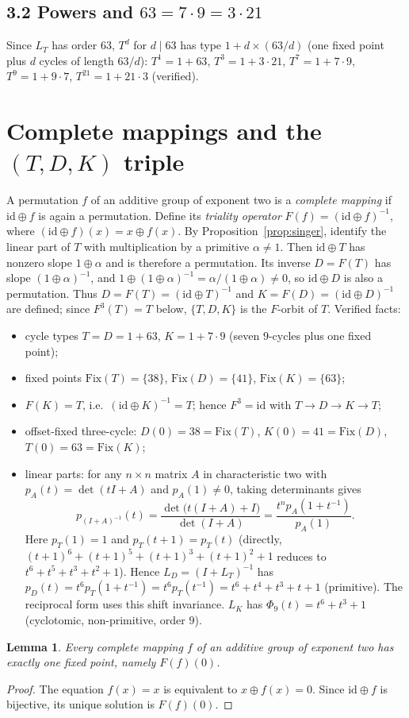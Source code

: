 \documentclass[11pt]{article}
\newtheorem{lemma}[theorem]{Lemma}
\begin{document}
\subsection*{3.2 Powers and $63=7\cdot 9=3\cdot 21$}
Since $L_T$ has order $63$, $T^d$ for $d\mid 63$ has type $1+d\times(63/d)$ (one fixed point plus $d$ cycles of length $63/d$):
$T^1=1+63$, $T^3=1+3\cdot21$, $T^7=1+7\cdot9$, $T^9=1+9\cdot7$,
$T^{21}=1+21\cdot3$ (verified).

\section[Complete mappings and the (T,D,K) triple]{Complete mappings and the $(T,D,K)$ triple}\label{sec:tdk}
A permutation $f$ of an additive group of exponent two is a \emph{complete
mapping} if $\mathrm{id}\oplus f$ is again a permutation. Define its
\emph{triality operator} $F(f)=(\mathrm{id}\oplus f)^{-1}$, where
$(\mathrm{id}\oplus f)(x)=x\oplus f(x)$. By Proposition~\ref{prop:singer},
identify the linear part of $T$ with multiplication by a primitive
$\alpha\ne1$. Then $\mathrm{id}\oplus T$ has nonzero slope
$1\oplus\alpha$ and is therefore a permutation. Its inverse $D=F(T)$ has slope
$(1\oplus\alpha)^{-1}$, and
$1\oplus(1\oplus\alpha)^{-1}=\alpha/(1\oplus\alpha)\ne0$, so
$\mathrm{id}\oplus D$ is also a permutation. Thus
$D=F(T)=(\mathrm{id}\oplus T)^{-1}$ and $K=F(D)=(\mathrm{id}\oplus D)^{-1}$ are
defined; since $F^3(T)=T$ below, $\{T,D,K\}$ is the $F$-orbit of $T$.
Verified facts:
\begin{itemize}
\item cycle types $T=D=1+63$, $K=1+7\cdot 9$ (seven $9$-cycles plus one fixed point);
\item fixed points $\mathrm{Fix}(T)=\{38\}$, $\mathrm{Fix}(D)=\{41\}$,
$\mathrm{Fix}(K)=\{63\}$;
\item $F(K)=T$, i.e.\ $(\mathrm{id}\oplus K)^{-1}=T$; hence $F^3=\mathrm{id}$ with
$T\to D\to K\to T$;
\item offset-fixed three-cycle: $D(0)=38=\mathrm{Fix}(T)$,
$K(0)=41=\mathrm{Fix}(D)$, $T(0)=63=\mathrm{Fix}(K)$;
\item linear parts: for any $n\times n$ matrix $A$ in characteristic two with
$p_A(t)=\det(tI+A)$ and $p_A(1)\ne0$, taking determinants gives
\[
p_{(I+A)^{-1}}(t)
=\frac{\det\bigl(t(I+A)+I\bigr)}{\det(I+A)}
=\frac{t^n p_A(1+t^{-1})}{p_A(1)}.
\]
Here $p_T(1)=1$ and $p_T(t+1)=p_T(t)$ (directly,
$(t+1)^6+(t+1)^5+(t+1)^3+(t+1)^2+1$ reduces to
$t^6+t^5+t^3+t^2+1$). Hence $L_D=(I+L_T)^{-1}$ has
$p_D(t)=t^6p_T(1+t^{-1})=t^6p_T(t^{-1})=t^6+t^4+t^3+t+1$
(primitive). The reciprocal form uses this shift invariance.
$L_K$ has $\Phi_9(t)=t^6+t^3+1$
(cyclotomic, non-primitive, order $9$).
\end{itemize}
\begin{lemma}\label{lem:fp}
Every complete mapping $f$ of an additive group of exponent two has exactly one
fixed point, namely $F(f)(0)$.
\end{lemma}
\begin{proof}
The equation $f(x)=x$ is equivalent to $x\oplus f(x)=0$.
Since $\mathrm{id}\oplus f$ is bijective, its unique solution is $F(f)(0)$.
\end{proof}
\end{document}
